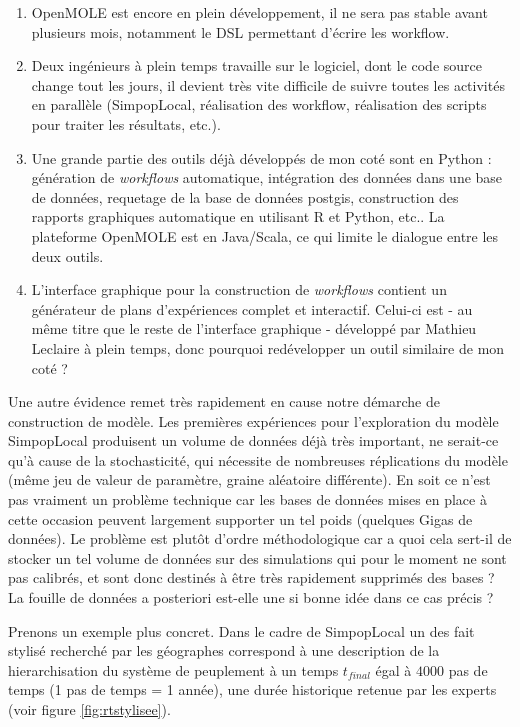 \begin{enumerate}[label=(\alph*),labelindent=\parindent,leftmargin=*]
\item OpenMOLE est encore en plein développement, il ne sera pas stable avant plusieurs mois, notamment le DSL permettant d'écrire les workflow.
\item Deux ingénieurs à plein temps travaille sur le logiciel, dont le code source change tout les jours, il devient très vite difficile de suivre toutes les activités en parallèle (SimpopLocal, réalisation des workflow, réalisation des scripts pour traiter les résultats, etc.).
\item Une grande partie des outils déjà développés de mon coté sont en Python : génération de \textit{workflows} automatique, intégration des données dans une base de données, requetage de la base de données postgis, construction des rapports graphiques automatique en utilisant R et Python, etc.. La plateforme OpenMOLE est en Java/Scala, ce qui limite le dialogue entre les deux outils.
\item L'interface graphique pour la construction de \textit{workflows} contient un générateur de plans d'expériences complet et interactif. Celui-ci est - au même titre que le reste de l'interface graphique - développé par Mathieu Leclaire à plein temps, donc pourquoi redévelopper un outil similaire de mon coté ?
\end{enumerate}

Une autre évidence remet très rapidement en cause notre démarche de construction de modèle. Les premières expériences pour l'exploration du modèle SimpopLocal produisent un volume de données déjà très important, ne serait-ce qu'à cause de la stochasticité, qui nécessite de nombreuses réplications du modèle (même jeu de valeur de paramètre, graine aléatoire différente). En soit ce n'est pas vraiment un problème technique car les bases de données mises en place à cette occasion peuvent largement supporter un tel poids (quelques Gigas de données). Le problème est plutôt d'ordre méthodologique car a quoi cela sert-il de stocker un tel volume de données sur des simulations qui pour le moment ne sont pas calibrés, et sont donc destinés à être très rapidement supprimés des bases ? La fouille de données a posteriori est-elle une si bonne idée dans ce cas précis ?

Prenons un exemple plus concret. Dans le cadre de SimpopLocal \autocites{Schmitt2015,Schmitt2014} un des fait stylisé recherché par les géographes correspond à une description de la hierarchisation du système de peuplement à un temps $t_{final}$ égal à $4000$ pas de temps (1 pas de temps = 1 année), une durée historique retenue par les experts (voir figure \ref{fig:rtstylisee}).

